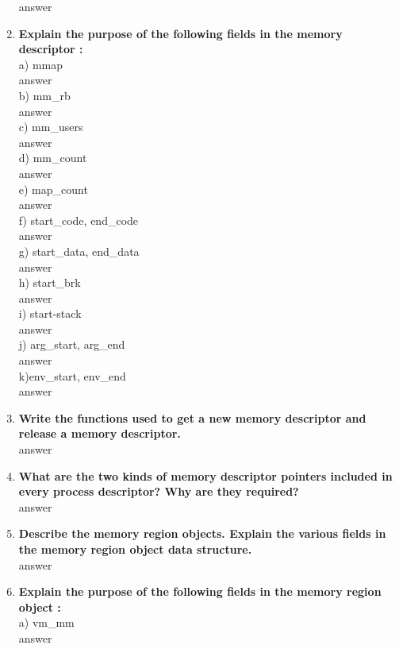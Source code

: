 \documentclass[a4paper,12pt]{article}
\begin{document}
\begin{flushleft}
\begin{enumerate}
{\color{red}answer}\\
\item \textbf{ Explain the purpose of the following fields in the memory descriptor :}\\
a) mmap\\
{\color{red}answer}\\
 b) mm\_rb \\
 {\color{red}answer}\\
 c) mm\_users \\
 {\color{red}answer}\\
 d) mm\_count\\
{\color{red}answer}\\
e) map\_count \\
{\color{red}answer}\\
f) start\_code, end\_code \\
{\color{red}answer}\\
g) start\_data, end\_data\\
{\color{red}answer}\\
h) start\_brk \\
{\color{red}answer}\\
i) start-stack \\
{\color{red}answer}\\
j) arg\_start, arg\_end \\
{\color{red}answer}\\
k)env\_start, env\_end\\
{\color{red}answer}\\
\item \textbf{ Write the functions used to get a new memory descriptor and release a memory descriptor.}\\
{\color{red}answer}\\
\item \textbf{ What are the two kinds of memory descriptor pointers included in every process descriptor? Why are they required?}\\
{\color{red}answer}\\
\item \textbf{ Describe the memory region objects. Explain the various fields in the memory region object data structure.}\\
{\color{red}answer}\\
\item \textbf{ Explain the purpose of the following fields in the memory region object :}\\
a) vm\_mm \\
{\color{red}answer}\\

\end{enumerate}
\end{flushleft}
\end{document}
